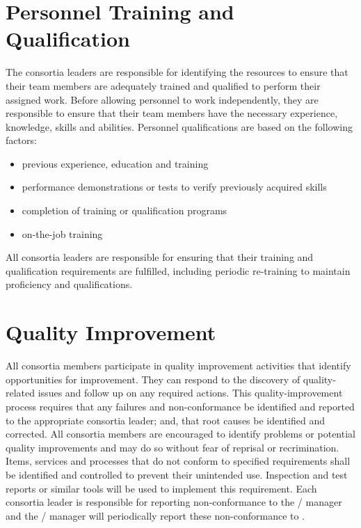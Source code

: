 \section{Personnel Training and Qualification}

The  consortia leaders are responsible for identifying the
resources to ensure that their team members are adequately trained and
qualified to perform their assigned work. Before allowing personnel to
work independently, they are responsible to ensure that their team
members have the necessary experience, knowledge, skills and
abilities. Personnel qualifications are based on the following
factors:
\begin{itemize}
 \item previous experience, education and training
 \item performance demonstrations or tests to verify previously
   acquired skills
 \item completion of training or qualification programs
 \item on-the-job training
\end{itemize}

All  consortia leaders are responsible for ensuring that
their training and qualification requirements are fulfilled, including
periodic re-training to maintain proficiency and qualifications.


\section{Quality Improvement}
\label{sec:quality_improvement}

All  consortia members participate in quality improvement
activities that identify opportunities for improvement. They can
respond to the discovery of quality-related issues and follow up on
any required actions. This quality-improvement process requires that
any failures and non-conformance be identified and reported to the
appropriate consortia leader; and, that root causes be identified and
corrected. All consortia members are encouraged to identify problems
or potential quality improvements and may do so without fear of
reprisal or recrimination. Items, services and processes that do not
conform to specified requirements shall be identified and controlled
to prevent their unintended use. Inspection and test reports or
similar tools will be used to implement this requirement. Each
consortia leader is responsible for reporting non-conformance to the
/  manager and the
/  manager will periodically report
these non-conformance to  .

